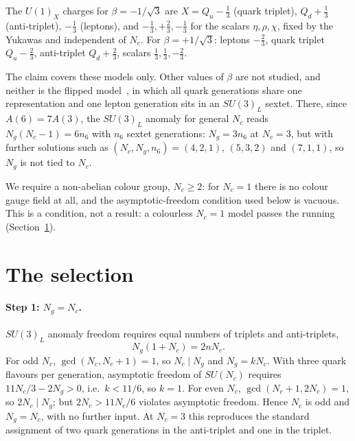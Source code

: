 \documentclass[11pt,a4paper]{article}
\newcommand{\Nc}{N_c}
\newcommand{\Ng}{N_g}
\begin{document}
The $U(1)_X$ charges for $\beta=-1/\sqrt3$ are $X=Q_u-\tfrac13$ (quark triplet),
$Q_d+\tfrac13$ (anti-triplet), $-\tfrac13$ (leptons), and $-\tfrac13,+\tfrac23,-\tfrac13$
for the scalars $\eta,\rho,\chi$, fixed by the Yukawas and independent of $\Nc$. For
$\beta=+1/\sqrt3$: leptons $-\tfrac23$, quark triplet $Q_u-\tfrac23$, anti-triplet
$Q_d+\tfrac23$, scalars $\tfrac13,\tfrac13,-\tfrac23$.

The claim covers these models only. Other values of $\beta$ are not studied, and neither is
the flipped model~\cite{Fonseca:2016tbn}, in which all quark generations share one
representation and one lepton generation sits in an $SU(3)_L$ sextet. There, since
$A(6)=7A(3)$, the $SU(3)_L$ anomaly for general $\Nc$ reads $\Ng(\Nc-1)=6n_6$ with $n_6$
sextet generations: $\Ng=3n_6$ at $\Nc=3$, but with further solutions such as
$(\Nc,\Ng,n_6)=(4,2,1)$, $(5,3,2)$ and $(7,1,1)$, so $\Ng$ is not tied to $\Nc$.

We require a non-abelian colour group, $\Nc\ge2$: for $\Nc=1$ there is no colour gauge
field at all, and the asymptotic-freedom condition used below is vacuous. This is a
condition, not a result: a colourless $\Nc=1$ model passes the running
(Section~\ref{sec:chain}).

\section{The selection}\label{sec:chain}

\paragraph{Step 1: $\Ng=\Nc$.}
$SU(3)_L$ anomaly freedom requires equal numbers of triplets and anti-triplets,
\begin{equation}\label{eq:anomaly}
  \Ng(1+\Nc)=2n\Nc .
\end{equation}
For odd $\Nc$, $\gcd(\Nc,\Nc+1)=1$, so $\Nc\mid\Ng$ and $\Ng=k\Nc$. With three quark
flavours per generation, asymptotic freedom of $SU(\Nc)$ requires
$11\Nc/3-2\Ng>0$, i.e.\ $k<11/6$, so $k=1$. For even $\Nc$, $\gcd(\Nc+1,2\Nc)=1$, so
$2\Nc\mid\Ng$; but $2\Nc>11\Nc/6$ violates asymptotic freedom. Hence $\Nc$ is odd and
$\Ng=\Nc$, with no further input. At $\Nc=3$ this reproduces the standard assignment of
two quark generations in the anti-triplet and one in the triplet.
\end{document}
